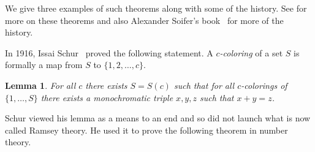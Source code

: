 \documentclass{article}
\theoremstyle{plain}
\newtheorem{lemma}[thm]{Lemma}
\theoremstyle{definition}
\newtheorem{definition}{Definition}
\newcommand{\Zed}{\mathbb{Z}}   %
\begin{document}
\begin{center}
\fbox{\parbox{6.5cm}{\it For any coloring of a large enough object
there is a nice monochromatic sub-object.}
}
\end{center}

We give three examples of such theorems along with some of the history. 
See \cite{GRS,RamseyInts,ramseypromel} for more on these theorems and also Alexander Soifer's book~\cite{coloring} for more of the history.

In 1916, Issai Schur~\cite{Schur} 
proved the following statement.  
A \emph{$c$-coloring} of a set $S$ is formally a map from $S$ to $\{1,2,\dots,c\}$.


\begin{lemma} 
\label{schur}
For all $c$ there exists $S=S(c)$ such that for all $c$-colorings of $\{1,\ldots,S\}$ 
there exists a  monochromatic triple $x,y,z$ such that $x+y=z$.
\end{lemma}


Schur viewed his lemma as a means to an end and so
did not launch what is now called Ramsey theory. 
He used it to prove the following theorem in number theory.


\end{document}
